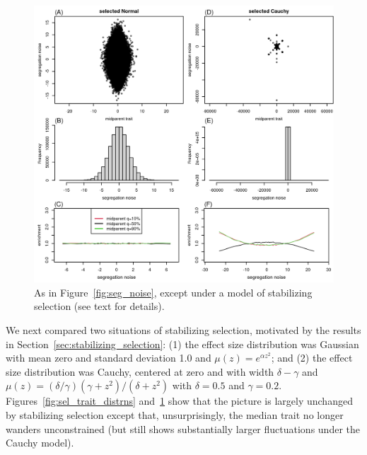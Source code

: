 \documentclass{article}
\newcommand{\1}{\mathbbm{1}}
\theoremstyle{remark}
\theoremstyle{definition}
\begin{document}
\begin{figure}
    \begin{center}
        \includegraphics{sims/selected_seg_noise}
    \end{center}
    \caption{
        As in Figure~\ref{fig:seg_noise},
        except under a model of stabilizing selection (see text for details).
        \label{fig:sel_seg_noise}
    }
\end{figure}

We next compared two situations of stabilizing selection, motivated by the results
in Section~\ref{sec:stabilizing_selection}:
(1) the effect size distribution was Gaussian with mean zero and standard deviation 1.0
and $\mu(z) = e^{\alpha z^2}$; and
(2) the effect size distribution was Cauchy, centered at zero and with width $\delta - \gamma$
and $\mu(z) = (\delta/\gamma) (\gamma + z^2) / (\delta + z^2)$ with $\delta=0.5$ and $\gamma=0.2$.
Figures~\ref{fig:sel_trait_distrns} and~\ref{fig:sel_seg_noise}
show that the picture is largely unchanged by stabilizing selection
except that, unsurprisingly, the median trait no longer wanders unconstrained
(but still shows substantially larger fluctuations under the Cauchy model).
\end{document}
